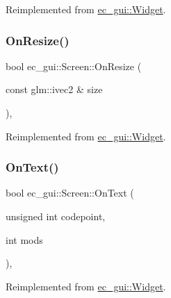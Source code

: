 Reimplemented from \mbox{\hyperlink{classec__gui_1_1_widget_a528c2b3639db65de6281fc1bb679dfcb}{ec\+\_\+gui\+::\+Widget}}.

\mbox{\label{classec__gui_1_1_screen_a739fe1176382a7f6f399610da74972ea}} 
\subsubsection{\texorpdfstring{On\+Resize()}{OnResize()}}
{\footnotesize\ttfamily bool ec\+\_\+gui\+::\+Screen\+::\+On\+Resize (\begin{DoxyParamCaption}\item[{const glm\+::ivec2 \&}]{size }\end{DoxyParamCaption})\hspace{0.3cm}{\ttfamily [override]}, {\ttfamily [virtual]}}



Reimplemented from \mbox{\hyperlink{classec__gui_1_1_widget_af352c24c35835706de550ee3b9cfbf91}{ec\+\_\+gui\+::\+Widget}}.

\mbox{\label{classec__gui_1_1_screen_ac2f9e1f91cc01bbe22d3b8c9c19659b6}} 
\subsubsection{\texorpdfstring{On\+Text()}{OnText()}}
{\footnotesize\ttfamily bool ec\+\_\+gui\+::\+Screen\+::\+On\+Text (\begin{DoxyParamCaption}\item[{unsigned int}]{codepoint,  }\item[{int}]{mods }\end{DoxyParamCaption})\hspace{0.3cm}{\ttfamily [override]}, {\ttfamily [virtual]}}



Reimplemented from \mbox{\hyperlink{classec__gui_1_1_widget_a99980fcd7af47e9f9d29c85a404729f6}{ec\+\_\+gui\+::\+Widget}}.

\mbox{\label{classec__gui_1_1_screen_a8a1e8f2db412a40632c580c547861b52}} 
